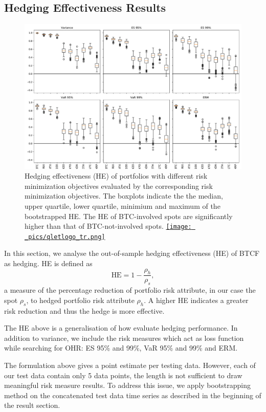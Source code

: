 \subsection{Hedging Effectiveness Results}\label{sec: HE results}
\begin{figure}[t]
\includegraphics[width=\textwidth]{_pics/HE_boxplot.pdf}
  \caption{Hedging effectiveness (HE) of portfolios with different risk minimization objectives evaluated by the corresponding risk minimization objectives.
            The boxplots indicate the the median, upper quartile, lower quartile, minimium and maximum of the bootstrapped HE.
            The HE of BTC-involved spots are significantly higher than that of BTC-not-involved spots.
  \href{http://www.quantlet.com/}{\texttt{[image: \_pics/qletlogo\_tr.png]}} }
\label{fig:HEboxplot}
\end{figure}
In this section, we analyse the out-of-sample hedging effectiveness (HE) of BTCF as hedging.
HE is defined as $$\text{HE} = 1-\frac{\rho_h}{\rho_s},$$
a measure of the percentage reduction of portfolio risk attribute, in our case the spot $\rho_s$,
to hedged portfolio risk attribute $\rho_h$.
A higher HE indicates a greater risk reduction and thus the hedge is more effective. \medskip

The HE above is a generalisation of how \citet{ederington1979hedging} evaluate hedging performance.
In addition to variance, we include the risk measures which act as loss function while searching for OHR: ES 95\% and 99\%, VaR 95\% and 99\% and ERM. \medskip

The formulation above gives a point estimate per testing data.
However, each of our test data contain only 5 data points, the length is not sufficient to draw meaningful risk measure results.
To address this issue, we apply bootstrapping method on the concatenated test data time series as described in the beginning of the result section. \medskip

